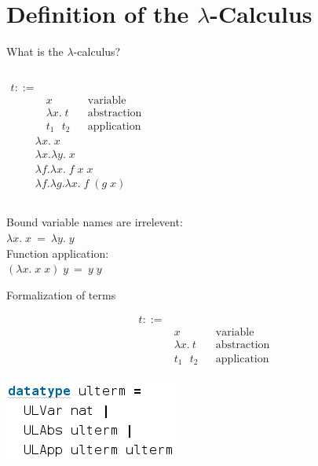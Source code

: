 \documentclass[xcolor=dvipsnames]{beamer}
\begin{document}
\section{Definition of the $\lambda$-Calculus}

\begin{frame}{What is the $\lambda$-calculus?}
  \begin{columns}[c]
      \begin{align*}
        t ::= & \\
          & x && \text{variable} \\
          & \lambda x. \; t && \text{abstraction} \\
          & t_1 \text{ } t_2 && \text{application}
      \end{align*}
      \begin{align*}
        & \lambda x. \; x \\
        & \lambda x. \lambda y. \; x \\
        & \lambda f. \lambda x. \; f \; x \; x \\
        & \lambda f. \lambda g. \lambda x. \; f \; (g \; x)
      \end{align*}
  \end{columns}
  \vspace{20pt}
  \begin{center}
    Bound variable names are irrelevent: \\
    $\lambda x. \; x \: = \: \lambda y. \; y$ \\
    \vspace{20pt}
    Function application: \\
    $(\lambda x. \; x \; x) \; y \: = \: y \; y$
  \end{center}
\end{frame}

\begin{frame}{Formalization of terms}
  \begin{center}
    \small
    \begin{align*}
      t ::= & \\
        & x && \text{variable} \\
        & \lambda x. \ t && \text{abstraction} \\
        & t_1 \text{ } t_2 && \text{application}
    \end{align*}\\
    \vspace{20pt}
    \includegraphics[scale=0.4]{term.png}
  \end{center}
\end{frame}
\end{document}
